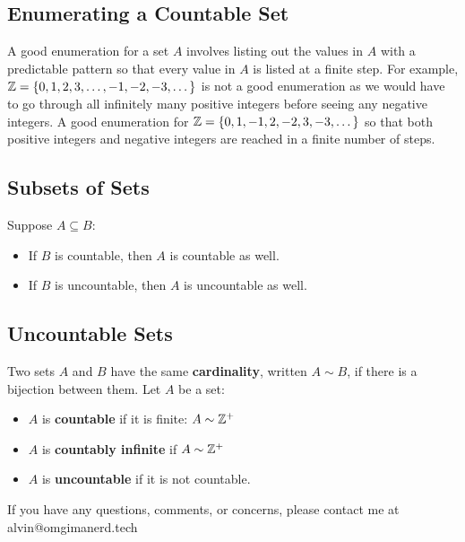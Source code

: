 \documentclass[letterpaper, 12pt]{math}
\begin{document}
\subsection*{Enumerating a Countable Set}
A good enumeration for a set \( A \) involves listing out the values in \( A \)
with a predictable pattern so that every value in \( A \) is listed at a finite
step. For example, \( \mathbb{Z} = \{0,1,2,3,\dots,-1,-2,-3,\dots\} \) is not a good
enumeration as we would have to go through all infinitely many positive
integers before seeing any negative integers. A good enumeration for
\( \mathbb{Z} = \{0,1,-1,2,-2,3,-3,\dots\} \) so that both positive integers and
negative integers are reached in a finite number of steps.

\subsection*{Subsets of Sets}
Suppose \( A\subseteq B \):
\begin{itemize}
  \item If \( B \) is countable, then \( A \) is countable as well.
  \item If \( B \) is uncountable, then \( A \) is uncountable as well.
\end{itemize}

\subsection*{Uncountable Sets}
Two sets \( A \) and \( B \) have the same \textbf{cardinality}, written
\( A\sim B \), if there is a bijection between them.
Let \( A \) be a set:
\begin{itemize}
  \item \( A \) is \textbf{countable} if it is finite: \( A \sim \mathbb{Z}^{+} \)
  \item \( A \) is \textbf{countably infinite} if \( A \sim \mathbb{Z}^{+} \)
  \item \( A \) is \textbf{uncountable} if it is not countable.
\end{itemize}

\begin{center}
  If you have any questions, comments, or concerns, please contact me at
  alvin@omgimanerd.tech
\end{center}
\end{document}

